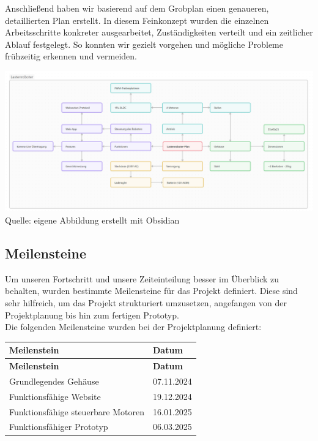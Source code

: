 \documentclass[ngerman,12pt,a4paper]{article}
\begin{document}
		\newpage \noindent
		Anschließend haben wir basierend auf dem Grobplan einen genaueren, detaillierten Plan erstellt. In diesem Feinkonzept wurden die einzelnen Arbeitsschritte konkreter ausgearbeitet, Zuständigkeiten verteilt und ein zeitlicher Ablauf festgelegt. So konnten wir gezielt vorgehen und mögliche Probleme frühzeitig erkennen und vermeiden.
		\begin{center}
			\begin{minipage}{\textwidth}
				\centering
				\includegraphics[scale=0.21]{Pictures/lastenroboter_plan}
				\label{fig:projekt_plan}
				\vspace{-4pt}
				{\small Quelle: eigene Abbildung erstellt mit Obsidian}
			\end{minipage}
		\end{center}
		\subsection{Meilensteine} %
		Um unseren Fortschritt und unsere Zeiteinteilung besser im Überblick zu behalten, wurden bestimmte Meilensteine für das Projekt definiert. Diese sind sehr hilfreich, um das Projekt strukturiert umzusetzen, angefangen von der Projektplanung bis hin zum fertigen Prototyp. \\[0.5cm]
		Die folgenden Meilensteine wurden bei der Projektplanung definiert:
		\begin{longtable}{| l | l |}
			\hline
			\textbf{Meilenstein} & \textbf{Datum} \\
			\hline
			\endfirsthead
			\hline
			\textbf{Meilenstein} & \textbf{Datum} \\
			\hline
			\endhead
			\hline
			Grundlegendes Gehäuse & 07.11.2024 \\
			\hline
			Funktionsfähige Website & 19.12.2024 \\
			\hline
			Funktionsfähige steuerbare Motoren & 16.01.2025 \\
			\hline
			Funktionsfähiger Prototyp & 06.03.2025 \\
			\hline
		\end{longtable}
		\newpage
\end{document}
